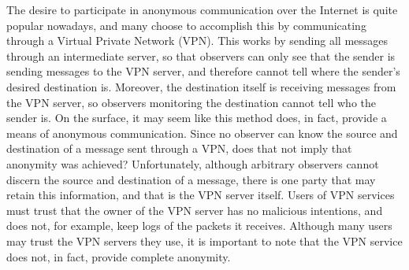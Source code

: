 \documentclass[10pt]{report}
\begin{document}
The desire to participate in anonymous communication over the Internet is quite popular nowadays,
and many choose to accomplish this by communicating through a Virtual Private Network (VPN). This
works by sending all messages through an intermediate server, so that observers can only see that
the sender is sending messages to the VPN server, and therefore cannot tell where the sender's
desired destination is. Moreover, the destination itself is receiving messages from the VPN server,
so observers monitoring the destination cannot tell who the sender is. On the surface, it may seem
like this method does, in fact, provide a means of anonymous communication. Since no observer can
know the source and destination of a message sent through a VPN, does that not imply that anonymity
was achieved? Unfortunately, although arbitrary observers cannot discern the source and destination
of a message, there is one party that may retain this information, and that is the VPN
server itself. Users of VPN services must trust that the owner of the VPN server has no malicious
intentions, and does not, for example, keep logs of the packets it receives. Although many users may
trust the VPN servers they use, it is important to note that the VPN service does not, in fact,
provide complete anonymity.\\
\end{document}
